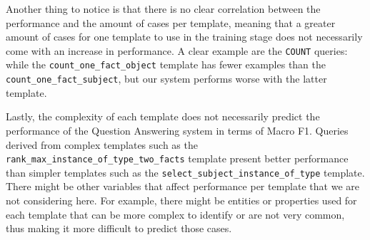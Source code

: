 Another thing to notice is that there is no clear correlation between the performance and the amount 
of cases per template, meaning that a greater amount of cases for one template to use in the training 
stage does not necessarily come with an increase in performance. A clear example are the \texttt{COUNT} 
queries: while the \texttt{count\_one\_fact\_object} template has fewer examples than the 
\texttt{count\_one\_fact\_subject}, but our system performs worse with the latter template. 

Lastly, the complexity of each template does not necessarily predict the performance of the Question 
Answering system in terms of Macro F1. Queries derived from complex templates such as the 
\texttt{rank\_max\_instance\_of\_type\_two\_facts} template present better performance than simpler 
templates such as the \texttt{select\_subject\_instance\_of\_type} template. There might be other 
variables that affect performance per template that we are not considering here. For example, there 
might be entities or properties used for each template that can be more complex to identify or are 
not very common, thus making it more difficult to predict those cases.
